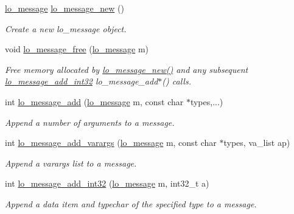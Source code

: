 \begin{DoxyCompactItemize}
\hyperlink{lo__types_8h_ad126083c98d941f00eb72d1690b38d63}{lo\-\_\-message} \hyperlink{group__liblolowlevel_ga2cce2e97452e3e9d6b5d3af33bb1d153}{lo\-\_\-message\-\_\-new} ()
\begin{DoxyCompactList}\small\item\em \-Create a new lo\-\_\-message object. \end{DoxyCompactList}\item 
void \hyperlink{group__liblolowlevel_ga93d3687e77ae20167b82830c917a3e50}{lo\-\_\-message\-\_\-free} (\hyperlink{lo__types_8h_ad126083c98d941f00eb72d1690b38d63}{lo\-\_\-message} m)
\begin{DoxyCompactList}\small\item\em \-Free memory allocated by \hyperlink{group__liblolowlevel_ga2cce2e97452e3e9d6b5d3af33bb1d153}{lo\-\_\-message\-\_\-new()} and any subsequent \hyperlink{group__liblolowlevel_ga7c9df1bd975a32fb6c8105e6fe327149}{lo\-\_\-message\-\_\-add\-\_\-int32} lo\-\_\-message\-\_\-add$\ast$() calls. \end{DoxyCompactList}\item 
int \hyperlink{group__liblolowlevel_ga4e7a6d91a06e795ded9676d089abea24}{lo\-\_\-message\-\_\-add} (\hyperlink{lo__types_8h_ad126083c98d941f00eb72d1690b38d63}{lo\-\_\-message} m, const char $\ast$types,...)
\begin{DoxyCompactList}\small\item\em \-Append a number of arguments to a message. \end{DoxyCompactList}\item 
int \hyperlink{group__liblolowlevel_ga9cd98b0c6ad5468692fd0b1936bd093f}{lo\-\_\-message\-\_\-add\-\_\-varargs} (\hyperlink{lo__types_8h_ad126083c98d941f00eb72d1690b38d63}{lo\-\_\-message} m, const char $\ast$types, va\-\_\-list ap)
\begin{DoxyCompactList}\small\item\em \-Append a varargs list to a message. \end{DoxyCompactList}\item 
int \hyperlink{group__liblolowlevel_ga7c9df1bd975a32fb6c8105e6fe327149}{lo\-\_\-message\-\_\-add\-\_\-int32} (\hyperlink{lo__types_8h_ad126083c98d941f00eb72d1690b38d63}{lo\-\_\-message} m, int32\-\_\-t a)
\begin{DoxyCompactList}\small\item\em \-Append a data item and typechar of the specified type to a message. \end{DoxyCompactList}\item 

\end{DoxyCompactItemize}
